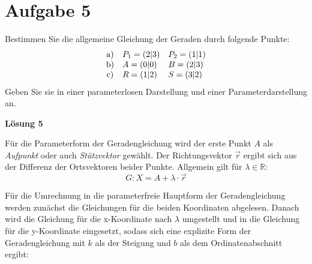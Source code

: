 \section{Aufgabe 5}

Bestimmen Sie die allgemeine Gleichung der Geraden durch folgende Punkte:
\begin{equation*}
	\begin{array}{ c l l }
		\text{a)} & P_{1} =( 2|3) & P_{2} =( 1|1)\\
		\text{b)} & A=( 0|0) & B=( 2|3)\\
		\text{c)} & R=( 1|2) & S=( 3|2)
	\end{array}
\end{equation*}
Geben Sie sie in einer parameterlosen Darstellung und einer Parameterdarstellung an.



\textbf{Lösung 5}

Für die Parameterform der Geradengleichung wird der erste Punkt $\displaystyle A$ als \textit{Aufpunkt} oder auch \textit{Stützvektor} gewählt. Der Richtungsvektor $\displaystyle \vec{r}$ ergibt sich aus der Differenz der Ortsvektoren beider Punkte. Allgemein gilt für $\displaystyle \lambda \in \mathbb{R}$:
\begin{equation*}
	G:X=A+\lambda \cdotp \vec{r}
\end{equation*}


Für die Umrechnung in die parameterfreie Hauptform der Geradengleichung werden zunächst die Gleichungen für die beiden Koordinaten abgelesen. Danach wird die Gleichung für die x-Koordinate nach $\displaystyle \lambda $ umgestellt und in die Gleichung für die y-Koordinate eingesetzt, sodass sich eine explizite Form der Geradengleichung mit $\displaystyle k$ als der Steigung und $\displaystyle b$ als dem Ordinatenabschnitt ergibt:


